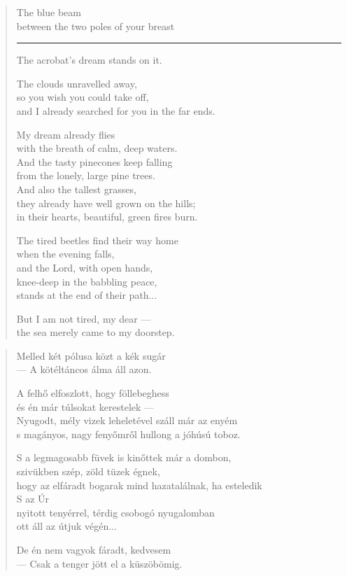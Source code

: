 \documentclass[11pt]{extbook}
\newcommand*{\centeredornament}{\centerline{\pgfornament[width=6cm]{88}}}
\begin{document}
\begin{verse}
  The blue beam \\
  between the two poles of your breast \\
  \rule[0.2em]{4em}{0.5pt} The acrobat's dream stands on it.

  The clouds unravelled away, \\
  so you wish you could take off, \\
  and I already searched for you in the far ends.\hspace*{-1mm}

  My dream already flies \\
  with the breath of calm, deep waters. \\
  And the tasty pinecones keep falling \\
  from the lonely, large pine trees. \\
  And also the tallest grasses, \\
  they already have well grown on the hills; \\
  in their hearts, beautiful, green fires burn.

  The tired beetles find their way home \\
  when the evening falls, \\
  and the Lord, with open hands, \\
  knee-deep in the babbling peace, \\
  stands at the end of their path...

  But I am not tired, my dear --- \\
  the sea merely came to my doorstep.
\end{verse}

\newpage

\vspace*{-15mm}
\centeredornament



\begin{verse}
  Melled két pólusa közt a kék sugár \\
  --- A kötéltáncos álma áll azon.

  A felhő elfoszlott, hogy föllebeghess \\
  és én már túlsokat kerestelek --- \\
  Nyugodt, mély vizek leheletével száll már az enyém \\
  s magányos, nagy fenyőmről hullong a jóhúsú toboz.

  S a legmagosabb füvek is kinőttek már a dombon, \\
  szivükben szép, zöld tüzek égnek, \\
  hogy az elfáradt bogarak mind hazatalálnak, ha esteledik \\
  S az Úr \\
  nyitott tenyérrel, térdig csobogó nyugalomban \\
  ott áll az útjuk végén...

  De én nem vagyok fáradt, kedvesem \\
  --- Csak a tenger jött el a küszöbömig.
\end{verse}
\end{document}
